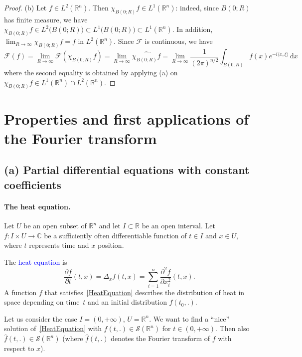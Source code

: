 \documentclass[12pt, oneside, a4paper]{article}
\theoremstyle{dfn}
\newcommand{\scalprod}[2]{\langle #1,#2 \rangle}
\def \S {\ensuremath{\mathcal{S}}}
\def \S {\ensuremath{\mathcal{S}}}
\def\Rbb{\ensuremath{\mathbb{R}}}
\def\dx{\,\mathrm dx}
\newcommand{\Fcal}{\mathcal{F}}
\newcommand{\Com}{\mathbb{C}}
\begin{document}
\begin{proof}
(b) Let $f \in L^2(\Rbb^n)$. Then $\chi_{B(0;R)} f \in L^1(\Rbb^n)$: indeed, since $B(0;R)$ has finite measure, we have $\chi_{B(0;R)} f \in L^2\big(B(0;R)\big) \subset L^1\big(B(0;R)\big) \subset L^1(\Rbb^n)$. In addition, $\lim_{R \to \infty} \chi_{B(0;R)} f = f$ in $L^2(\Rbb^n)$. Since $\Fcal$ is continuous, we have
\[
\Fcal(f) = \lim_{R\to\infty} \Fcal(\chi_{B(0;R)} f)
=\lim_{R\to\infty} \widehat{\chi_{B(0;R)} f}
= \lim_{R\to\infty} \frac{1}{(2\pi)^{n/2}} \int_{B(0;R)} f(x) e^{-i\scalprod{x}{\xi}} \dx
\]
where the second equality is obtained by applying (a) on $\chi_{B(0;R)} f \in L^1(\Rbb^n) \cap L^2(\Rbb^n)$.
\end{proof}

\section{Properties and first applications of the Fourier transform}\label{Subsection:PropertiesFT}

\subsection{(a) Partial differential equations with constant coefficients}

\paragraph{The heat equation.} Let $U$ be an open subset of $\Rbb^n$ and let $I \subset \Rbb$ be an open interval. Let $f\colon I \times U \to \Com$ be a sufficiently often differentiable function of $t \in I$ and $x \in U$, where $t$ represents time and $x$ position.

The \textcolor{blue}{heat equation} is
\begin{equation}\label{HeatEquation}
\frac{\partial f}{\partial t} (t,x) = \Delta_x f(t,x) = \sum_{i=1}^n \frac{\partial^2 f}{\partial x_i^2} (t,x).
\end{equation}
A function $f$ that satisfies~\eqref{HeatEquation} describes the distribution of heat in space depending on time~$t$ and an initial distribution $f(t_0,.)$.

Let us consider the case $I = (0,+\infty)$, $U = \Rbb^n$. We want to find a ``nice'' solution of~\eqref{HeatEquation} with $f(t,.) \in \S(\Rbb^n)$ for $t \in (0,+\infty)$. Then also $\widehat{f}(t,.) \in \S(\Rbb^n)$ (where $\widehat{f}(t,.)$ denotes the Fourier transform of $f$ with respect to $x$).
\end{document}
